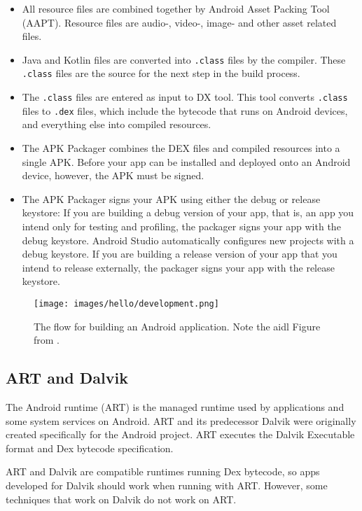 \begin{itemize}
	\item All resource files are combined together by Android Asset Packing Tool (AAPT).
	Resource files are audio-, video-, image-  and other asset related files.
	\item Java and Kotlin files are converted into \texttt{.class} files by the compiler.
	These \texttt{.class} files are the source for the next step in the build process.
	\item The \texttt{.class}  files are entered as input to DX tool.
	This tool converts \texttt{.class} files to \texttt{.dex} files, which include the bytecode that runs on Android devices, and everything else into compiled resources.
	\item The APK Packager combines the DEX files and compiled resources into a single APK.
	Before your app can be installed and deployed onto an Android device, however, the APK must be signed.
	\item The APK Packager signs your APK using either the debug or release keystore:
	If you are building a debug version of your app, that is, an app you intend only for testing and profiling, the packager signs your app with the debug keystore.
	Android Studio automatically configures new projects with a debug keystore.
	If you are building a release version of your app that you intend to release externally, the packager signs your app with the release keystore.
\end{itemize}


\begin{figure}[hb]
	\texttt{[image: images/hello/development.png]}
	\caption{The flow for building an Android application.
		Note the \gls{aidl} Figure from \cite{Developers2018build}.}
	\label{fig:develop}
\end{figure}

\subsection{ART and Dalvik}
The Android runtime (ART) \cite{Android2019} is the managed runtime used by applications and some system services on Android.
ART and its predecessor Dalvik were originally created specifically for the Android project.
ART executes the Dalvik Executable format and Dex bytecode specification.

ART and Dalvik are compatible runtimes running Dex bytecode, so apps developed for Dalvik should work when running with ART.
However, some techniques that work on Dalvik do not work on ART.

